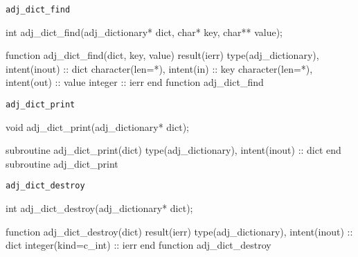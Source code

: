 \begin{boxwithtitle}{\texttt{adj_dict_find}}
\begin{minipage}{\columnwidth}
\begin{ccode}
  int adj_dict_find(adj_dictionary* dict, char* key, char** value);
\end{ccode}
\begin{fortrancode}
  function adj_dict_find(dict, key, value) result(ierr)
    type(adj_dictionary), intent(inout) :: dict
    character(len=*), intent(in) :: key
    character(len=*), intent(out) :: value
    integer :: ierr
  end function adj_dict_find
\end{fortrancode}
\end{minipage}
\end{boxwithtitle}


\begin{boxwithtitle}{\texttt{adj_dict_print}}
\begin{minipage}{\columnwidth}
\begin{ccode}
  void adj_dict_print(adj_dictionary* dict);
\end{ccode}
\begin{fortrancode}
  subroutine adj_dict_print(dict)
    type(adj_dictionary), intent(inout) :: dict
  end subroutine adj_dict_print
\end{fortrancode}
\end{minipage}
\end{boxwithtitle}


\begin{boxwithtitle}{\texttt{adj_dict_destroy}}
\begin{minipage}{\columnwidth}
\begin{ccode}
  int adj_dict_destroy(adj_dictionary* dict);
\end{ccode}
\begin{fortrancode}
  function adj_dict_destroy(dict) result(ierr)
    type(adj_dictionary), intent(inout) :: dict
    integer(kind=c_int) :: ierr
  end function adj_dict_destroy
\end{fortrancode}
\end{minipage}
\end{boxwithtitle}

